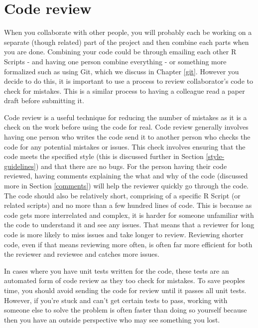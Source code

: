 \documentclass[
]{krantz}
\begin{document}
\hypertarget{code-review}{%
\section{Code review}\label{code-review}}

When you collaborate with other people, you will probably each be working on a separate (though related) part of the project and then combine each parts when you are done. Combining your code could be through emailing each other R Scripts - and having one person combine everything - or something more formalized such as using Git, which we discuss in Chapter \ref{git}. However you decide to do this, it is important to use a process to review collaborator's code to check for mistakes. This is a similar process to having a colleague read a paper draft before submitting it.

Code review is a useful technique for reducing the number of mistakes as it is a check on the work before using the code for real. Code review generally involves having one person who writes the code send it to another person who checks the code for any potential mistakes or issues. This check involves ensuring that the code meets the specified style (this is discussed further in Section \ref{style-guidelines}) and that there are no bugs. For the person having their code reviewed, having comments explaining the what and why of the code (discussed more in Section \ref{comments}) will help the reviewer quickly go through the code. The code should also be relatively short, comprising of a specific R Script (or related scripts) and no more than a few hundred lines of code. This is because as code gets more interrelated and complex, it is harder for someone unfamiliar with the code to understand it and see any issues. That means that a reviewer for long code is more likely to miss issues and take longer to review. Reviewing shorter code, even if that means reviewing more often, is often far more efficient for both the reviewer and reviewee and catches more issues.

In cases where you have unit tests written for the code, these tests are an automated form of code review as they too check for mistakes. To save peoples time, you should avoid sending the code for review until it passes all unit tests. However, if you're stuck and can't get certain tests to pass, working with someone else to solve the problem is often faster than doing so yourself because then you have an outside perspective who may see something you lost.
\end{document}
